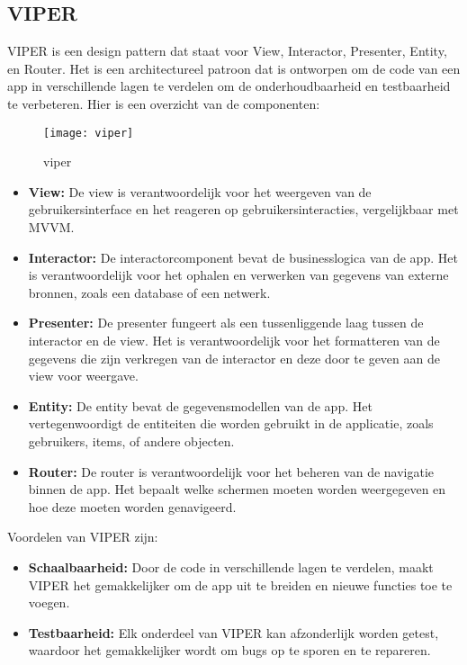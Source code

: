 \subsection{VIPER}
\autocite{MediumVIPER} VIPER is een design pattern dat staat voor View, Interactor, Presenter, Entity, en Router. Het is een architectureel patroon dat is ontworpen om de code van een app in verschillende lagen te verdelen om de onderhoudbaarheid en testbaarheid te verbeteren. Hier is een overzicht van de componenten:
\begin{figure}[H]
    \centering
    \texttt{[image: viper]} 
    \caption{viper}
    \label{fig:viper}
\end{figure}

\begin{itemize}
    \item {\textbf{View:} De view is verantwoordelijk voor het weergeven van de gebruikersinterface en het reageren op gebruikersinteracties, vergelijkbaar met MVVM.}
    \item {\textbf{Interactor:} De interactorcomponent bevat de businesslogica van de app. Het is verantwoordelijk voor het ophalen en verwerken van gegevens van externe bronnen, zoals een database of een netwerk.}
    \item {\textbf{Presenter:} De presenter fungeert als een tussenliggende laag tussen de interactor en de view. Het is verantwoordelijk voor het formatteren van de gegevens die zijn verkregen van de interactor en deze door te geven aan de view voor weergave.}
    \item {\textbf{Entity:} De entity bevat de gegevensmodellen van de app. Het vertegenwoordigt de entiteiten die worden gebruikt in de applicatie, zoals gebruikers, items, of andere objecten.}
    \item {\textbf{Router:} De router is verantwoordelijk voor het beheren van de navigatie binnen de app. Het bepaalt welke schermen moeten worden weergegeven en hoe deze moeten worden genavigeerd.}
\end{itemize}
Voordelen van VIPER zijn:
\begin{itemize}
    \item {\textbf{Schaalbaarheid:} Door de code in verschillende lagen te verdelen, maakt VIPER het gemakkelijker om de app uit te breiden en nieuwe functies toe te voegen.}
    \item {\textbf{Testbaarheid:} Elk onderdeel van VIPER kan afzonderlijk worden getest, waardoor het gemakkelijker wordt om bugs op te sporen en te repareren.}
\end{itemize}

